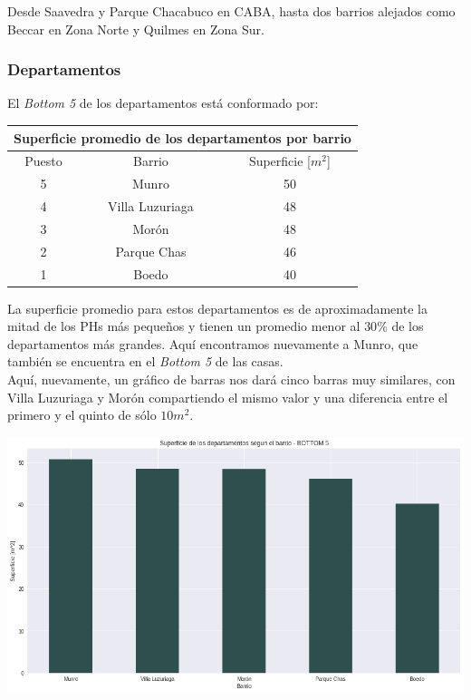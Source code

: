 \documentclass[a4paper, 10pt]{article}
\newcommand\tab[1][0.5cm]{\hspace*{#1}}
\begin{document}
				  	\tab Desde Saavedra y Parque Chacabuco en CABA, hasta dos barrios alejados como Beccar en Zona Norte y Quilmes
				  	en Zona Sur.
				\subsubsection{Departamentos}
					El \emph{Bottom 5} de los departamentos está conformado por:
					\begin{center}
						\begin{tabular}{ |c|c|c| }
							\hline
							\multicolumn{3}{|c|}{Superficie promedio de los departamentos por barrio}\\
							\hline
							\hline
							Puesto & Barrio & Superficie [$m^2$]\\
							\hline
							5 & Munro & 50\\
							4 & Villa Luzuriaga & 48\\
							3 & Morón & 48\\
							2 & Parque Chas & 46\\
							1 & Boedo & 40\\
							\hline
						\end{tabular}
					\end{center}
					\tab La superficie promedio para estos departamentos es de aproximadamente la mitad de los PHs más pequeños
					y tienen un promedio menor al $30\%$ de los departamentos más grandes. Aquí encontramos nuevamente a Munro, que
					también se encuentra en el \emph{Bottom 5} de las casas. \\
					\tab Aquí, nuevamente, un gráfico de barras nos dará cinco barras muy similares, con Villa Luzuriaga y Morón
					compartiendo el mismo valor y una diferencia entre el primero y el quinto de sólo  $10m^2$.
					\begin{center}
   		    				\includegraphics[width=\textwidth]{../images/apartmentSurfaceBottomBar}
				  	\end{center}
\end{document}
